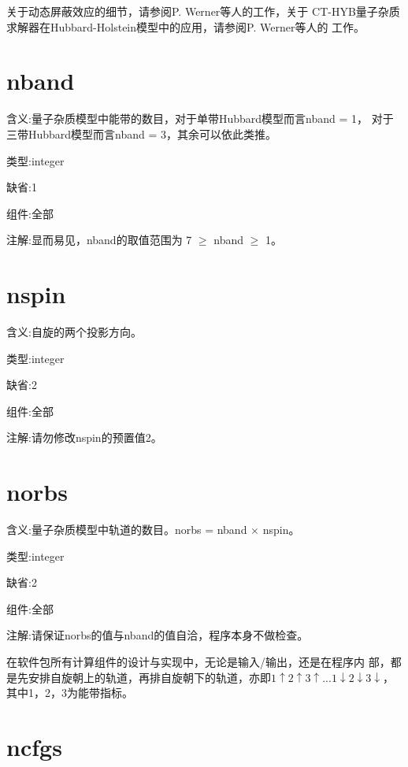 关于动态屏蔽效应的细节，请参阅P. Werner等人的工作\cite{werner:2010}，关于
CT-HYB量子杂质求解器在Hubbard-Holstein模型中的应用，请参阅P. Werner等人的
工作\cite{werner:146404}。

\section{nband }
\label{sec:nband}

{\color{red}含义}:量子杂质模型中能带的数目，对于单带Hubbard模型而言nband = 1，
对于三带Hubbard模型而言nband = 3，其余可以依此类推。

{\color{green}类型}:integer

{\color{blue}缺省}:1

{\color{brown}组件}:全部

{\color{purple}注解}:显而易见，nband的取值范围为 7 $\geq$ nband $\geq$ 1。

\section{nspin }
\label{sec:nspin}

{\color{red}含义}:自旋的两个投影方向。

{\color{green}类型}:integer

{\color{blue}缺省}:2

{\color{brown}组件}:全部

{\color{purple}注解}:请勿修改nspin的预置值2。

\section{norbs }
\label{sec:norbs}

{\color{red}含义}:量子杂质模型中轨道的数目。norbs = nband $\times$ nspin。

{\color{green}类型}:integer

{\color{blue}缺省}:2

{\color{brown}组件}:全部

{\color{purple}注解}:请保证norbs的值与nband的值自洽，程序本身不做检查。

在{\iqist}软件包所有计算组件的设计与实现中，无论是输入/输出，还是在程序内
部，都是先安排自旋朝上的轨道，再排自旋朝下的轨道，亦即$1\uparrow 2 \uparrow 
3\uparrow$...$1\downarrow 2 \downarrow 3\downarrow$，其中1，2，3为能带指标。

\section{ncfgs }
\label{sec:ncfgs}

